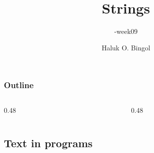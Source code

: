 \documentclass[aspectratio=169,10pt,compress]{beamer}
\title[\cisOOO-week09-String]{
	Strings
}
\subtitle{
	\cisOOO-week09
}
\author[Bingol]{
	Haluk O. Bingol
}
\institute[FCIS]{
    Faculty of Computer and Information Sciences\\
    Yeditepe University
}
\date{
	{\tiny \hbTimeStamp}
}
\begin{document}




\begin{frame}[t,fragile]
  \titlepage
\end{frame}




\begin{frame}[t,fragile] \frametitle{Outline}
  \begin{columns}[T]
    \begin{column}{0.48\textwidth}
      \tableofcontents[sections={1-7}, hideallsubsections]
    \end{column}
    \begin{column}{0.48\textwidth}
      \tableofcontents[sections={8-14}, hideallsubsections]
    \end{column}
  \end{columns}
\end{frame}





\subsection[Text]{Text in programs}
\end{document}
